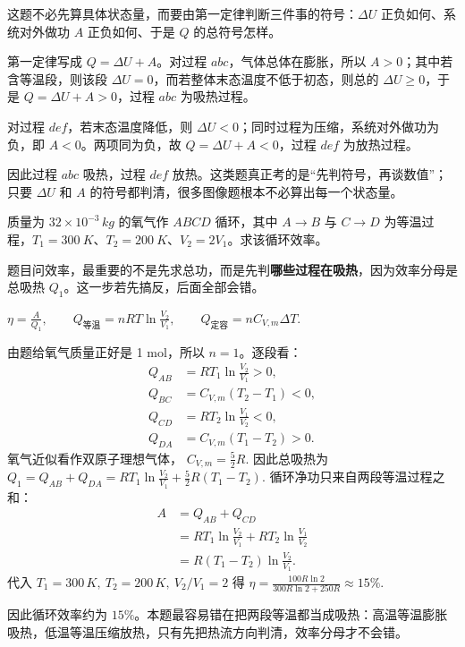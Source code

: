 \documentclass[lang=cn,11pt]{elegantbook}
\begin{document}
\begin{solution}
这题不必先算具体状态量，而要由第一定律判断三件事的符号：\(\Delta U\) 正负如何、系统对外做功 \(A\) 正负如何、于是 \(Q\) 的总符号怎样。

第一定律写成 \(Q=\Delta U+A\)。对过程 \(abc\)，气体总体在膨胀，所以 \(A>0\)；其中若含等温段，则该段 \(\Delta U=0\)，而若整体末态温度不低于初态，则总的 \(\Delta U\ge0\)，于是 \(Q=\Delta U+A>0\)，过程 \(abc\) 为吸热过程。

对过程 \(def\)，若末态温度降低，则 \(\Delta U<0\)；同时过程为压缩，系统对外做功为负，即 \(A<0\)。两项同为负，故 \(Q=\Delta U+A<0\)，过程 \(def\) 为放热过程。

因此过程 \(abc\) 吸热，过程 \(def\) 放热。这类题真正考的是“先判符号，再谈数值”；只要 \(\Delta U\) 和 \(A\) 的符号都判清，很多图像题根本不必算出每一个状态量。
\end{solution}

\begin{exercise}
质量为 \(32\times10^{-3}\,\si{kg}\) 的氧气作 \(ABCD\) 循环，其中 \(A\to B\) 与 \(C\to D\) 为等温过程，\(T_1=\SI{300}{K}\)、\(T_2=\SI{200}{K}\)、\(V_2=2V_1\)。求该循环效率。
\end{exercise}

\begin{solution}
题目问效率，最重要的不是先求总功，而是先判\textbf{哪些过程在吸热}，因为效率分母是总吸热 \(Q_1\)。这一步若先搞反，后面全部会错。

 \(\eta=\frac{A}{Q_1},\qquad Q_{\text{等温}}=nRT\ln\frac{V_2}{V_1},\qquad Q_{\text{定容}}=nC_{V,m}\Delta T.\) 

由题给氧气质量正好是 1 mol，所以 \(n=1\)。逐段看：
\[
\begin{aligned}
Q_{AB}&=RT_1\ln\frac{V_2}{V_1}>0,\\
Q_{BC}&=C_{V,m}(T_2-T_1)<0,\\
Q_{CD}&=RT_2\ln\frac{V_1}{V_2}<0,\\
Q_{DA}&=C_{V,m}(T_1-T_2)>0.
\end{aligned}
\]
氧气近似看作双原子理想气体，
 \(C_{V,m}=\frac{5}{2}R.\) 
因此总吸热为
 \(Q_1=Q_{AB}+Q_{DA} =RT_1\ln\frac{V_2}{V_1}+\frac{5}{2}R(T_1-T_2).\) 
循环净功只来自两段等温过程之和：
\[
\begin{aligned}
A&=Q_{AB}+Q_{CD}\\
&=RT_1\ln\frac{V_2}{V_1}+RT_2\ln\frac{V_1}{V_2}\\
&=R(T_1-T_2)\ln\frac{V_2}{V_1}.
\end{aligned}
\]
代入 \(T_1=300\,\si{K},\ T_2=200\,\si{K},\ V_2/V_1=2\) 得
 \(\eta=\frac{100R\ln 2}{300R\ln 2+250R}\approx 15\%.\) 

因此循环效率约为 \(15\%\)。本题最容易错在把两段等温都当成吸热：高温等温膨胀吸热，低温等温压缩放热，只有先把热流方向判清，效率分母才不会错。
\end{solution}
\end{document}

